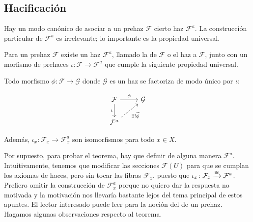 \documentclass{article}
\numberwithin{equation}{section}
\theoremstyle{definition}
\begin{document}
\subsection{Hacificación}

Hay un modo canónico de asociar a un prehaz $\mathcal{F}$ cierto haz
$\mathcal{F}^a$. La construcción particular de $\mathcal{F}^a$ es irrelevante;
lo importante es la propiedad universal.

\begin{teorema}
  Para un prehaz $\mathcal{F}$ existe un haz $\mathcal{F}^a$, llamado
  la  de $\mathcal{F}$ o el haz  a
  $\mathcal{F}$, junto con un morfismo de prehaces
  $\iota\colon \mathcal{F} \to \mathcal{F}^a$ que cumple la siguiente propiedad
  universal.

  Todo morfismo $\phi\colon \mathcal{F} \to \mathcal{G}$ donde $\mathcal{G}$
  es un haz se factoriza de modo único por $\iota$:

  \[ \begin{tikzcd}
      \mathcal{F} \ar{r}{\phi}\ar{d}[swap]{\iota} & \mathcal{G} \\
      \mathcal{F}^a\ar[dashed]{ur}[swap]{\exists! \widetilde{\phi}}
    \end{tikzcd} \]

  Además, $\iota_x\colon \mathcal{F}_x \to \mathcal{F}^a_x$ son isomorfismos
  para todo $x \in X$.
\end{teorema}

Por supuesto, para probar el teorema, hay que definir de alguna manera
$\mathcal{F}^a$. Intuitivamente, tenemos que modificar las secciones
$\mathcal{F} (U)$ para que se cumplan los axiomas de haces, pero sin tocar
las fibras $\mathcal{F}_x$, puesto que
$\iota_x\colon \mathcal{F}_x \xrightarrow{\cong} \mathcal{F}^a$. Prefiero omitir
la construcción de $\mathcal{F}^a_x$ porque no quiero dar la respuesta no
motivada y la motivación nos llevaría bastante lejos del tema principal de estos
apuntes. El lector interesado puede leer \cite[Chapter II]{MacLane-Moerdijk}
para la noción del  de un prehaz. Hagamos algunas
observaciones respecto al teorema.
\end{document}
